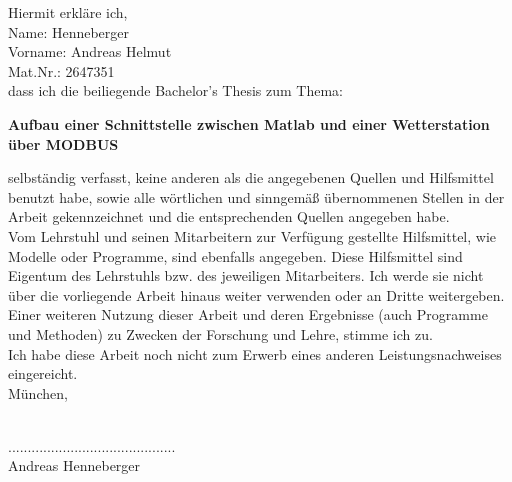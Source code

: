 \noindent Hiermit erkläre ich,\\
Name: Henneberger\\
Vorname: Andreas Helmut\\
Mat.Nr.: 2647351\vspace{0.4cm}\\
dass ich die beiliegende Bachelor's Thesis zum Thema:\vspace{0.5cm}\\
\begin{center}
\textbf{Aufbau einer Schnittstelle zwischen Matlab und einer Wetterstation über MODBUS}
\end{center}\vspace{0.4cm}
selbständig verfasst, keine anderen als die angegebenen Quellen und Hilfsmittel benutzt habe,
sowie alle wörtlichen und sinngemäß übernommenen Stellen in der Arbeit gekennzeichnet und die 
entsprechenden Quellen angegeben habe.\\
Vom Lehrstuhl und seinen Mitarbeitern zur Verfügung gestellte Hilfsmittel, wie Modelle oder
Programme, sind ebenfalls angegeben. Diese Hilfsmittel sind Eigentum des Lehrstuhls bzw. des
jeweiligen Mitarbeiters. Ich werde sie nicht über die vorliegende Arbeit hinaus weiter verwenden
oder an Dritte weitergeben.\vspace{0.5cm}\\

\noindent Einer weiteren Nutzung dieser Arbeit und deren Ergebnisse (auch Programme und Methoden) zu Zwecken
der Forschung und Lehre, stimme ich zu.\vspace{0.5cm}\\

\noindent Ich habe diese Arbeit noch nicht zum Erwerb eines anderen Leistungsnachweises eingereicht.\vspace{0.5cm}\\

\noindent München, \date{\today}\vspace{0.5cm}\\
\noindent ...........................................\\
Andreas Henneberger
